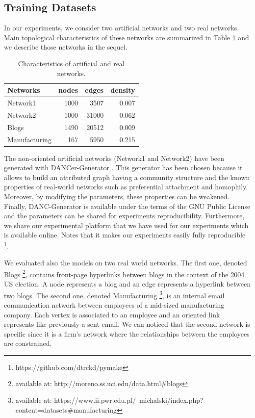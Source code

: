 \subsection{Training Datasets}

In our experiments, we consider two artificial networks and two real networks.  Main topological characteristics of these networks are summarized in Table \ref{table:networks_measures} and we describe those networks in the sequel.

\begin{table}[h] 
	\centering
	\caption{Characteristics of artificial and real networks.}
    \begin{tabular}{lrrr}
        \hline
        \textbf{Networks} &   nodes &   edges &   density \\
        \hline
        Network1 &    1000 &    3507 &     0.007 \\
        Network2 &    1000 &   31000 &     0.062 \\
        Blogs         &    1490 &   20512 &     0.009 \\
        Manufacturing &     167 &    5950 &     0.215 \\
    \hline
    \end{tabular}
	\label{table:networks_measures}
\end{table}

The non-oriented artificial networks (Network1 and Network2) have been generated with DANCer-Generator \cite{largeron2015}. This generator has been chosen because it allows to build an attributed graph having a community structure  and  the known properties of real-world networks such as preferential attachment and homophily.
Moreover, by modifying the parameters, these properties can be weakened. Finally, DANC-Generator is available under the terms of the GNU Public License and the parameters can be shared for experiments reproducibility. Furthermore, we share our experimental platform that we have used for our experiments which is available online. Notes that it makes our experiments easily fully reproducible \footnote{https://github.com/dtrckd/pymake}.


We evaluated also the models on two real world networks.
The first one, denoted Blogs \footnote{available at: http://moreno.ss.uci.edu/data.html\#blogs}, contains front-page hyperlinks between blogs in the context of the 2004 US election. A node represents a blog and an edge represents a hyperlink between two blogs.
The second one, denoted Manufacturing \footnote{available at: https://www.ii.pwr.edu.pl/~michalski/index.php?content=datasets\#manufacturing}, is an internal email communication network between employees of a mid-sized manufacturing company. Each vertex is associated  to an employee and an oriented link represents like previously a sent email. We can noticed that the second network is specific since it is a firm's network where the relationships between the employees are constrained. 


